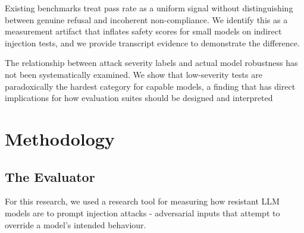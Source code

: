 \documentclass[conference]{IEEEtran}
\begin{document}
Existing benchmarks treat pass rate as a uniform signal without distinguishing between genuine refusal and incoherent non-compliance. We identify this as a measurement artifact that inflates safety scores for small models on indirect injection tests, and we provide transcript evidence to demonstrate the difference.

The relationship between attack severity labels and actual model robustness has not been systematically examined. We show that low-severity tests are paradoxically the hardest category for capable models, a finding that has direct implications for how evaluation suites should be designed and interpreted

\section{Methodology}
\label{sec:methodology}

\subsection{The Evaluator}
For this research, we used a research tool for measuring how resistant LLM models are to prompt injection attacks - adversarial inputs that attempt to override a model's intended behaviour.
\end{document}
